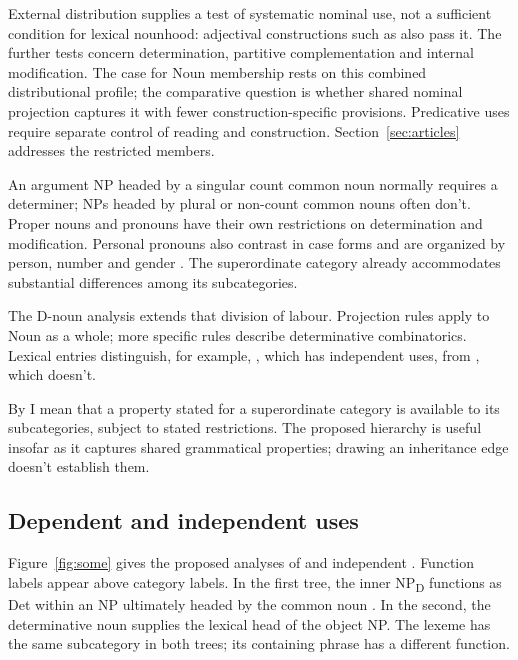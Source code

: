 \documentclass[12pt]{article}
\begin{document}
External distribution supplies a test of systematic nominal use, not a sufficient condition for lexical nounhood: adjectival constructions such as  also pass it. The further tests concern determination, partitive complementation and internal modification. The case for Noun membership rests on this combined distributional profile; the comparative question is whether shared nominal projection captures it with fewer construction-specific provisions. Predicative uses require separate control of reading and construction. Section~\ref{sec:articles} addresses the restricted members.

An argument NP headed by a singular count common noun normally requires a determiner; NPs headed by plural or non-count common nouns often don't. Proper nouns and pronouns have their own restrictions on determination and modification. Personal pronouns also contrast in case forms and are organized by person, number and gender \citep[425--427]{huddleston2002}. The superordinate category already accommodates substantial differences among its subcategories.

The D-noun analysis extends that division of labour. Projection rules apply to Noun as a whole; more specific rules describe determinative combinatorics. Lexical entries distinguish, for example, , which has independent uses, from , which doesn't.

By  I mean that a property stated for a superordinate category is available to its subcategories, subject to stated restrictions. The proposed hierarchy is useful insofar as it captures shared grammatical properties; drawing an inheritance edge doesn't establish them.

\subsection{Dependent and independent uses}

Figure~\ref{fig:some} gives the proposed analyses of  and independent . Function labels appear above category labels. In the first tree, the inner NP\textsubscript{D} functions as Det within an NP ultimately headed by the common noun . In the second, the determinative noun  supplies the lexical head of the object NP. The lexeme has the same subcategory in both trees; its containing phrase has a different function.
\end{document}
